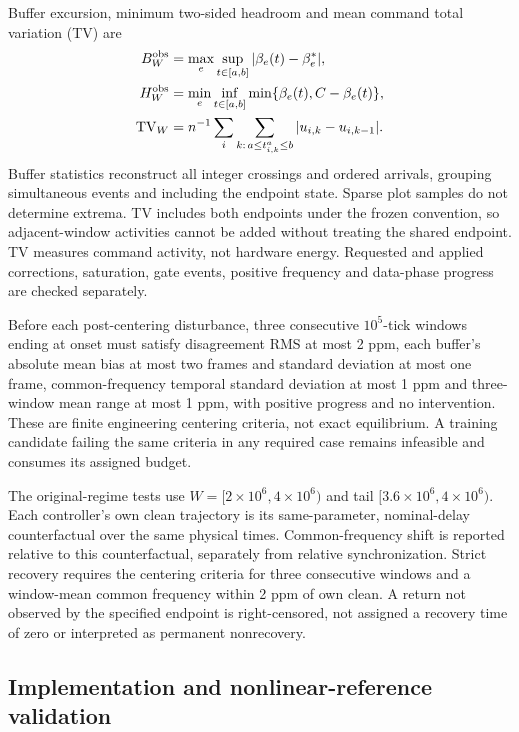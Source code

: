 Buffer excursion, minimum two-sided headroom and mean command total
variation (TV) are
\begin{align}
 B_W^{\rm obs}&=\max_e\sup_{t\in[a,b]}|\beta_e(t)-\beta_e^*|,\nonumber\\
 H_W^{\rm obs}&=\min_e\inf_{t\in[a,b]}
                         \min\{\beta_e(t),C-\beta_e(t)\},
 \label{eq:eval_buffer_metrics}\\
 \mathrm{TV}_W&=n^{-1}\sum_i
       \sum_{k:\,a\le t^a_{i,k}\le b}|u_{i,k}-u_{i,k-1}|.
 \label{eq:eval_tv}
\end{align}
Buffer statistics reconstruct all integer crossings and ordered arrivals,
grouping simultaneous events and including the endpoint state. Sparse
plot samples do not determine extrema. TV includes both endpoints under
the frozen convention, so adjacent-window activities cannot be added
without treating the shared endpoint. TV measures command activity,
not hardware energy. Requested and applied corrections, saturation,
gate events, positive frequency and data-phase progress are checked
separately.

Before each post-centering disturbance, three consecutive $10^5$-tick
windows ending at onset must satisfy disagreement RMS at most 2 ppm,
each buffer's absolute mean bias at most two frames and standard
deviation at most one frame, common-frequency temporal standard
deviation at most 1 ppm and three-window mean range at most 1 ppm,
with positive progress and no intervention. These are finite
engineering centering criteria, not exact equilibrium. A training
candidate failing the same criteria in any required case remains
infeasible and consumes its assigned budget.

The original-regime tests use $W=[2\times10^6,4\times10^6)$ and tail
$[3.6\times10^6,4\times10^6)$. Each controller's own clean trajectory
is its same-parameter, nominal-delay counterfactual over the same
physical times. Common-frequency shift is reported relative to this
counterfactual, separately from relative synchronization. Strict
recovery requires the centering criteria for three consecutive windows
and a window-mean common frequency within 2 ppm of own clean. A return
not observed by the specified endpoint is right-censored, not assigned
a recovery time of zero or interpreted as permanent nonrecovery.

\subsection{Implementation and nonlinear-reference validation}
\label{subsec:eval_implementation_reference}

